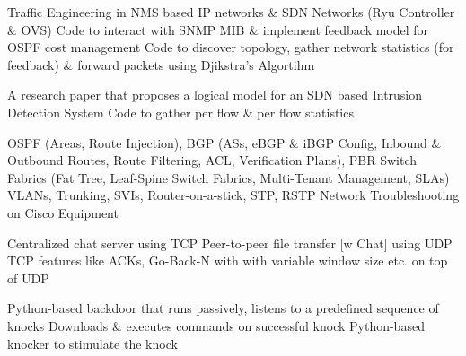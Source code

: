 \documentclass[print]{danis-resume}
\begin{document}
\begin{minipage}[t]{0.66\textwidth}
Traffic Engineering in NMS based IP networks \& SDN Networks (Ryu Controller \& OVS)
\textbullet{} Code to interact with SNMP MIB \& implement feedback model for OSPF cost management \textbullet{} Code to discover topology, gather network statistics (for feedback) \& forward packets using Djikstra's Algortihm
\sectionsep

A research paper that proposes a logical model for an SDN based Intrusion Detection System \textbullet{} Code to gather per flow \& per flow statistics
\sectionsep

\descript{}
OSPF (Areas, Route Injection), BGP (ASs, eBGP \& iBGP Config, Inbound \& Outbound Routes, Route Filtering, ACL, Verification Plans), PBR \textbullet{} Switch Fabrics (Fat Tree, Leaf-Spine Switch Fabrics, Multi-Tenant Management, SLAs) \textbullet{} VLANs, Trunking, SVIs, Router-on-a-stick, STP, RSTP  \textbullet{} Network Troubleshooting on Cisco Equipment
\sectionsep

Centralized chat server using TCP \textbullet{} Peer-to-peer file transfer [w Chat] using UDP \textbullet{} TCP features like ACKs, Go-Back-N with with variable window size etc. on top of UDP
\sectionsep

Python-based backdoor that runs passively, listens to a predefined sequence of knocks \textbullet{} Downloads \& executes commands on successful knock \textbullet{} Python-based knocker to stimulate the knock
\sectionsep

\end{minipage} 
\end{document}
